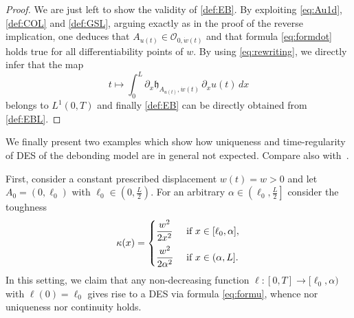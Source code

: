 \documentclass[a4paper,11pt,reqno]{amsart}
\numberwithin{equation}{section}
\theoremstyle{definition}
\theoremstyle{remark}
\begin{document}
\begin{proof}
        We are just left to show the validity of \ref{def:EB}. By exploiting \eqref{eq:Au1d}, \ref{def:COL} and \ref{def:GSL}, arguing exactly as in the proof of the reverse implication, one deduces that $A_{u(t)}\in \mathcal O_{0,\dot w(t)}$ and that formula \eqref{eq:formdot} holds true for all differentiability points of $w$. By using \eqref{eq:rewriting}, we directly infer that the map
        \begin{equation}
            t\mapsto \int_0^L \partial_x \mathfrak{h}_{A_{u(t)},\dot w(t)}\,\partial_x u(t)\, dx
        \end{equation}
        belongs to $L^1(0,T)$ and finally \ref{def:EB} can be directly obtained from \ref{def:EBL}. 
    \end{proof}

    We finally present two examples which show how uniqueness and time-regularity of DES of the debonding model are in general not expected. Compare also with~\cite[Section 2]{RivQuas}.
    
    First, consider a constant prescribed displacement $w(t)=w>0$ and let $A_0=(0,\ell_0)$ with $\ell_0\in \left(0,\frac L2\right)$. For an arbitrary $\alpha\in \left(\ell_0,\frac L2\right]$ consider the toughness
    \begin{equation}
        \kappa(x)=\begin{cases}\displaystyle
            \frac{w^2}{2x^2} & \text{ if }x\in [\ell_0,\alpha],\vspace{2mm}
\\            \displaystyle\frac{w^2}{2\alpha^2} & \text{ if }x\in (\alpha,L].
        \end{cases}
    \end{equation}
    In this setting, we claim that any non-decreasing function $\ell\colon [0,T]\to [\ell_0,\alpha)$ with $\ell(0)=\ell_0$ gives rise to a DES via formula \eqref{eq:formu}, whence nor uniqueness nor continuity holds.
\end{document}
